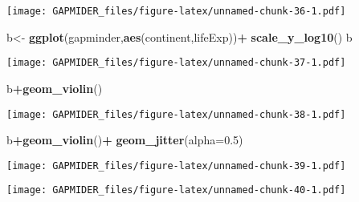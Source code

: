 \documentclass[]{article}
\newenvironment{Shaded}{\begin{snugshade}}{\end{snugshade}}
\newcommand{\DataTypeTok}[1]{\textcolor[rgb]{0.13,0.29,0.53}{#1}}
\newcommand{\FloatTok}[1]{\textcolor[rgb]{0.00,0.00,0.81}{#1}}
\newcommand{\KeywordTok}[1]{\textcolor[rgb]{0.13,0.29,0.53}{\textbf{#1}}}
\newcommand{\NormalTok}[1]{#1}
\newcommand{\OperatorTok}[1]{\textcolor[rgb]{0.81,0.36,0.00}{\textbf{#1}}}
\newcommand{\StringTok}[1]{\textcolor[rgb]{0.31,0.60,0.02}{#1}}
\begin{document}
\texttt{[image: GAPMIDER\_files/figure-latex/unnamed-chunk-36-1.pdf]}

\begin{Shaded}
\begin{Highlighting}[]
\NormalTok{b<-}\StringTok{ }\KeywordTok{ggplot}\NormalTok{(gapminder,}\KeywordTok{aes}\NormalTok{(continent,lifeExp))}\OperatorTok{+}
\StringTok{  }\KeywordTok{scale_y_log10}\NormalTok{()}
\NormalTok{b}
\end{Highlighting}
\end{Shaded}

\texttt{[image: GAPMIDER\_files/figure-latex/unnamed-chunk-37-1.pdf]}

\begin{Shaded}
\begin{Highlighting}[]
\NormalTok{b}\OperatorTok{+}\KeywordTok{geom_violin}\NormalTok{()}
\end{Highlighting}
\end{Shaded}

\texttt{[image: GAPMIDER\_files/figure-latex/unnamed-chunk-38-1.pdf]}

\begin{Shaded}
\begin{Highlighting}[]
\NormalTok{b}\OperatorTok{+}\KeywordTok{geom_violin}\NormalTok{()}\OperatorTok{+}
\StringTok{  }\KeywordTok{geom_jitter}\NormalTok{(}\DataTypeTok{alpha=}\FloatTok{0.5}\NormalTok{)}
\end{Highlighting}
\end{Shaded}

\texttt{[image: GAPMIDER\_files/figure-latex/unnamed-chunk-39-1.pdf]}

\begin{Shaded}
\end{Shaded}

\texttt{[image: GAPMIDER\_files/figure-latex/unnamed-chunk-40-1.pdf]}
\end{document}
